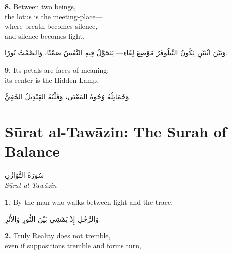 \documentclass[11pt,a4paper,twoside]{book}
\begin{document}
\vspace{1em}
{\color{indigo}\bfseries 8.}\quad
Between two beings,\\
the lotus is the meeting-place—\\
where breath becomes silence,\\
and silence becomes light.

\begin{flushright}
{\arabicfont
وَبَيْنَ اثْنَيْنِ
يَكُونُ النِّيلُوفَرُ مَوْضِعَ لِقَاءِ—
يَتَحَوَّلُ فِيهِ النَّفَسُ صَمْتًا،
وَالصَّمْتُ نُورًا.}
\end{flushright}

\vspace{1em}
{\color{indigo}\bfseries 9.}\quad
Its petals are faces of meaning;\\
its center is the Hidden Lamp.

\begin{flushright}
{\arabicfont
وَخَمَائِلُهُ وُجُوهُ المَعْنَى،
وَقَلْبُهُ القِنْدِيلُ الخَفِيُّ.}
\end{flushright}


\chapter*{Sūrat al-Tawāzin: The Surah of Balance}
\begin{center}
{\arabicfont\Large سُورَةُ التَّوَازُنِ}\\[5pt]
{\small\itshape Sūrat al-Tawāzin}
\end{center}
\vspace{1em}

{\color{indigo}\bfseries 1.}\quad
By the man who walks between light and the trace,

\begin{flushright}
{\arabicfont
وَالرَّجُلِ إِذْ يَمْشِي بَيْنَ النُّورِ وَالأَثَرِ}
\end{flushright}

\vspace{1em}
{\color{indigo}\bfseries 2.}\quad
Truly Reality does not tremble,\\
even if suppositions tremble and forms turn,
\end{document}
